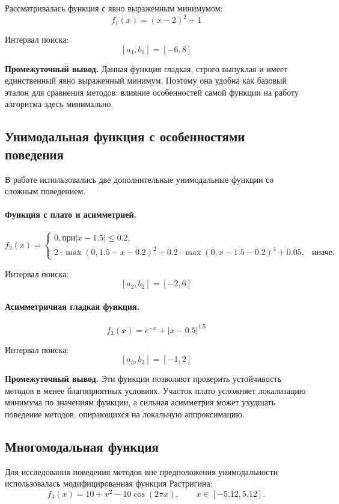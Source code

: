 \documentclass[14pt,a4paper]{extarticle}
\begin{document}
Рассматривалась функция с явно выраженным минимумом:
\[
f_1(x) = (x - 2)^2 + 1
\]

Интервал поиска:
\[
[a_1, b_1] = [-6, 8]
\]

\textbf{Промежуточный вывод.} Данная функция гладкая, строго выпуклая и имеет единственный явно выраженный минимум. Поэтому она удобна как базовый эталон для сравнения методов: влияние особенностей самой функции на работу алгоритма здесь минимально.

\subsection{Унимодальная функция с особенностями поведения}

В работе использовались две дополнительные унимодальные функции со сложным поведением.

\paragraph{Функция с плато и асимметрией.}
\[
f_2(x)=
\begin{cases}
0, \text{при} |x-1.5|\le 0.2, \\
2 \cdot \max(0, 1.5-x-0.2)^2 + 0.2 \cdot \max(0, x-1.5-0.2)^4 + 0.05, & \text{иначе.}
\end{cases}
\]

Интервал поиска:
\[
[a_2, b_2] = [-2, 6]
\]

\paragraph{Асимметричная гладкая функция.}
\[
f_3(x) = e^{-x} + |x - 0.5|^{1.5}
\]

Интервал поиска:
\[
[a_3, b_3] = [-1, 2]
\]

\textbf{Промежуточный вывод.} Эти функции позволяют проверить устойчивость методов в менее благоприятных условиях. Участок плато усложняет локализацию минимума по значениям функции, а сильная асимметрия может ухудшать поведение методов, опирающихся на локальную аппроксимацию.

\subsection{Многомодальная функция}

Для исследования поведения методов вне предположения унимодальности использовалась модифицированная функция Растригина:
\[
f_4(x) = 10 + x^2 - 10\cos(2\pi x), \qquad x \in [-5.12, 5.12].
\]
\end{document}
